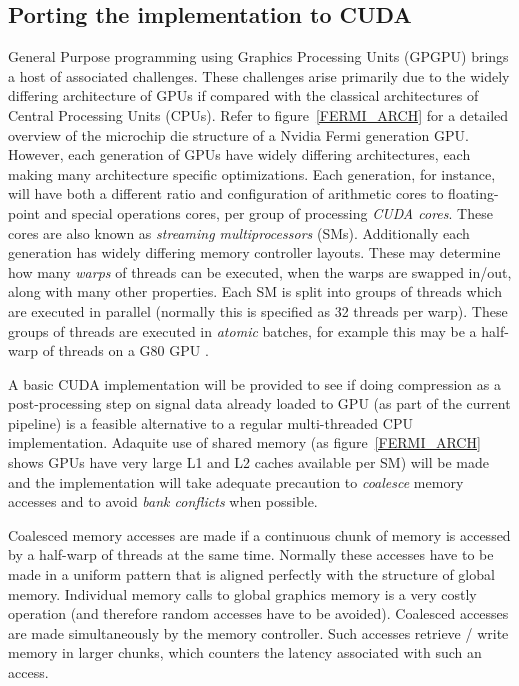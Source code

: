 \subsection{Porting the implementation to CUDA}
General Purpose programming using Graphics Processing Units (GPGPU) brings a host of associated challenges. These challenges arise primarily due to the widely differing architecture of GPUs if compared
with the classical architectures of Central Processing Units (CPUs). Refer to figure~\ref{FERMI_ARCH} for a detailed overview of the microchip die structure of a Nvidia Fermi generation GPU. 
However, each generation of GPUs have widely differing architectures, each making many architecture specific optimizations. Each generation, for instance, will have both a 
different ratio and configuration of arithmetic cores to floating-point and special operations cores, per group of processing \textit{CUDA cores}. These cores are also known as 
\textit{streaming multiprocessors} (SMs). Additionally each generation has widely differing memory controller layouts. These may determine how many \textit{warps} of threads can be executed, when 
the warps are swapped in/out, along with many other properties. Each SM is split into groups of threads which are executed in parallel (normally this is specified as 32 threads per warp). 
These groups of threads are executed in \emph{atomic} batches, for example this may be a half-warp of threads on a G80 GPU \cite{harris2007parallel}.

A basic CUDA implementation will be provided to see if doing compression as a post-processing step on signal data already loaded to GPU (as part of the current pipeline) is a 
feasible alternative to a regular multi-threaded CPU implementation. Adaquite use of shared memory (as figure~\ref{FERMI_ARCH} shows GPUs have very large L1 and L2 caches available per SM) 
will be made and the implementation will take adequate precaution to \textit{coalesce} memory accesses and to avoid \textit{bank conflicts} when possible. 

Coalesced memory accesses are made if a continuous chunk of memory is accessed by a half-warp of threads at the same time. Normally these accesses have to be made in a uniform pattern that is aligned perfectly
with the structure of global memory. Individual memory calls to global graphics memory is a very costly operation (and therefore random accesses have to be avoided). Coalesced accesses are made simultaneously by 
the memory controller. Such accesses retrieve / write memory in larger chunks, which counters the latency associated with such an access. 

